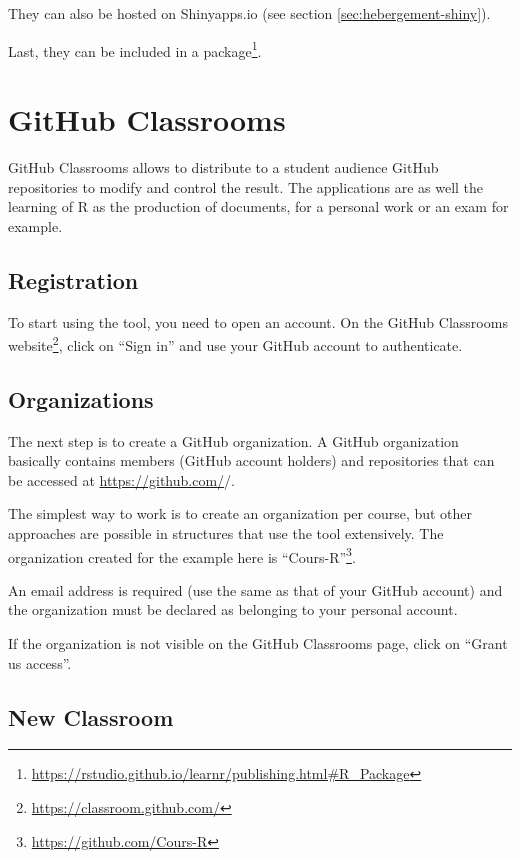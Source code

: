 \documentclass[
  12pt,
  american,
  a4paper,
  extrafontsizes,onecolumn,openright
  ]{memoir}
\begin{document}
They can also be hosted on Shinyapps.io (see section \ref{sec:hebergement-shiny}).

Last, they can be included in a package\footnote{\url{https://rstudio.github.io/learnr/publishing.html\#R_Package}}.

\section{GitHub Classrooms}\label{github-classrooms}

GitHub Classrooms allows to distribute to a student audience GitHub repositories to modify and control the result.
The applications are as well the learning of R as the production of documents, for a personal work or an exam for example.

\subsection{Registration}\label{registration}

To start using the tool, you need to open an account.
On the GitHub Classrooms website\footnote{\url{https://classroom.github.com/}}, click on \enquote{Sign in} and use your GitHub account to authenticate.

\subsection{Organizations}\label{organizations}

The next step is to create a GitHub organization.
A GitHub organization basically contains members (GitHub account holders) and repositories that can be accessed at \url{https://github.com/}/.

The simplest way to work is to create an organization per course, but other approaches are possible in structures that use the tool extensively.
The organization created for the example here is \enquote{Cours-R}\footnote{\url{https://github.com/Cours-R}}.

An email address is required (use the same as that of your GitHub account) and the organization must be declared as belonging to your personal account.

If the organization is not visible on the GitHub Classrooms page, click on \enquote{Grant us access}.

\subsection{New Classroom}\label{new-classroom}
\end{document}
